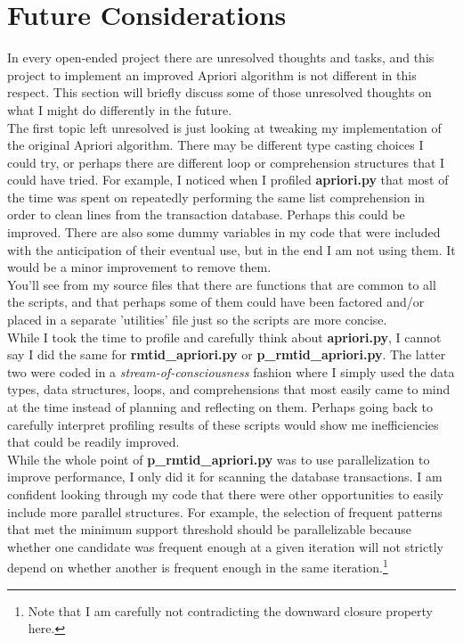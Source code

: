 \documentclass[12 pt]{article}
\begin{document}
\section{Future Considerations}

In every open-ended project there are unresolved thoughts and tasks, and this project to implement an improved Apriori algorithm is not different in this respect. This section will briefly discuss some of those unresolved thoughts on what I might do differently in the future.\\

The first topic left unresolved is just looking at tweaking my implementation of the original Apriori algorithm. There may be different type casting choices I could try, or perhaps there are different loop or comprehension structures that I could have tried. For example, I noticed when I profiled \textbf{apriori.py} that most of the time was spent on repeatedly performing the same list comprehension in order to clean lines from the transaction database. Perhaps this could be improved. There are also some dummy variables in my code that were included with the anticipation of their eventual use, but in the end I am not using them. It would be a minor improvement to remove them.\\

You'll see from my source files that there are functions that are common to all the scripts, and that perhaps some of them could have been factored and/or placed in a separate 'utilities' file just so the scripts are more concise.\\

While I took the time to profile and carefully think about \textbf{apriori.py}, I cannot say I did the same for \textbf{rmtid\_apriori.py} or \textbf{p\_rmtid\_apriori.py}. The latter two were coded in a \textit{stream-of-consciousness} fashion where I simply used the data types, data structures, loops, and comprehensions that most easily came to mind at the time instead of planning and reflecting on them. Perhaps going back to carefully interpret profiling results of these scripts would show me inefficiencies that could be readily improved.\\

While the whole point of \textbf{p\_rmtid\_apriori.py} was to use parallelization to improve performance, I only did it for scanning the database transactions. I am confident looking through my code that there were other opportunities to easily include more parallel structures. For example, the selection of frequent patterns that met the minimum support threshold should be parallelizable because whether one candidate was frequent enough at a given iteration will not strictly depend on whether another is frequent enough in the same iteration.\footnote{Note that I am carefully not contradicting the downward closure property here.}\\
\end{document}
